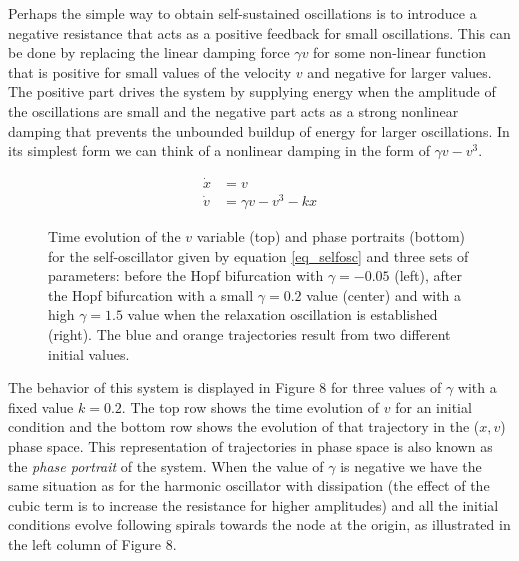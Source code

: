 \documentclass{article}
\begin{document}
Perhaps the simple way to obtain self-sustained oscillations is to introduce a negative resistance that acts as a positive feedback for small oscillations.
This can be done by replacing the linear damping force $\gamma v$ for some non-linear function that is positive for small values of the velocity $v$ and negative for larger values.
The positive part drives the system by supplying energy when the amplitude of the oscillations are small and the negative part acts as a strong nonlinear damping that prevents the unbounded buildup of energy for larger oscillations. 
In its simplest form we can think of a nonlinear damping in the form of $\gamma v - v ^ 3$.

\begin{subequations} \label{eq_selfosc}
\begin{align}
    \dot{x} & = v \\
    \dot{v} & = \gamma v - v^3 -kx 
\end{align}
\end{subequations}


\begin{figure}
    \centering
    \caption{Time evolution of the $v$ variable (top) and phase portraits (bottom) for the self-oscillator given by equation \ref{eq_selfosc} and three sets of parameters: before the Hopf bifurcation with $\gamma=-0.05$ (left), after the Hopf bifurcation with a small $\gamma=0.2$ value (center) and with a high $\gamma=1.5$ value when the relaxation oscillation is established (right). The blue and orange trajectories result from two different initial values.} 
    \label{fig_selfosc}
\end{figure}

The behavior of this system is displayed in Figure 8 for three values of $\gamma$ with a fixed value $k=0.2$. 
The top row shows the time evolution of $v$ for an initial condition and the bottom row shows the evolution of that trajectory in the ($x,v$) phase space.
This representation of trajectories in phase space is also known as the {\em phase portrait} of the system.
When the value of $\gamma$ is negative we have the same situation as for the harmonic oscillator with dissipation (the effect of the cubic term is to increase the resistance for higher amplitudes) and all the initial conditions evolve following spirals towards the node at the origin, as illustrated in the left column of Figure 8. 
\end{document}
